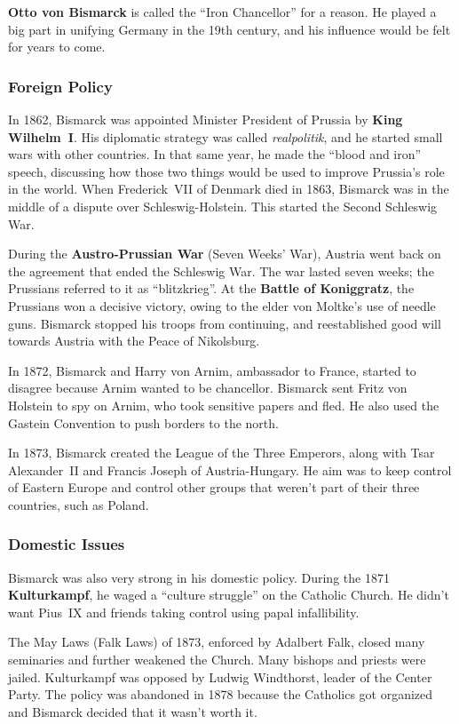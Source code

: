 \textbf{Otto von Bismarck} is called the ``Iron Chancellor'' for a reason.
He played a big part in unifying Germany in the 19th century, and his influence would be felt for years to come.

\subsubsection*{Foreign Policy}

In 1862, Bismarck was appointed Minister President of Prussia by \textbf{King Wilhelm~I}.
His diplomatic strategy was called \textit{realpolitik}, and he started small wars with other countries.
In that same year, he made the ``blood and iron'' speech,
discussing how those two things would be used to improve Prussia's role in the world.
When Frederick~VII of Denmark died in 1863, Bismarck was in the middle of a dispute over Schleswig-Holstein.
This started the Second Schleswig War.

During the \textbf{Austro-Prussian War} (Seven Weeks' War),
Austria went back on the agreement that ended the Schleswig War.
The war lasted seven weeks; the Prussians referred to it as ``blitzkrieg''.
At the \textbf{Battle of Koniggratz}, the Prussians won a decisive victory,
owing to the elder von Moltke's use of needle guns.
Bismarck stopped his troops from continuing,
and reestablished good will towards Austria with the Peace of Nikolsburg.

In 1872, Bismarck and Harry von Arnim, ambassador to France, started to disagree because Arnim wanted to be chancellor.
Bismarck sent Fritz von Holstein to spy on Arnim, who took sensitive papers and fled.
He also used the Gastein Convention to push borders to the north.

In 1873, Bismarck created the League of the Three Emperors,
along with Tsar Alexander~II and Francis Joseph of Austria-Hungary.
He aim was to keep control of Eastern Europe and control other groups that weren't part of their three countries,
such as Poland.

\subsubsection*{Domestic Issues}

Bismarck was also very strong in his domestic policy.
During the 1871 \textbf{Kulturkampf}, he waged a ``culture struggle'' on the Catholic Church.
He didn't want Pius~IX and friends taking control using papal infallibility.

The May Laws (Falk Laws) of 1873, enforced by Adalbert Falk, closed many seminaries and further weakened the Church.
Many bishops and priests were jailed.
Kulturkampf was opposed by Ludwig Windthorst, leader of the Center Party.
The policy was abandoned in 1878 because the Catholics got organized and Bismarck decided that it wasn't worth it.

